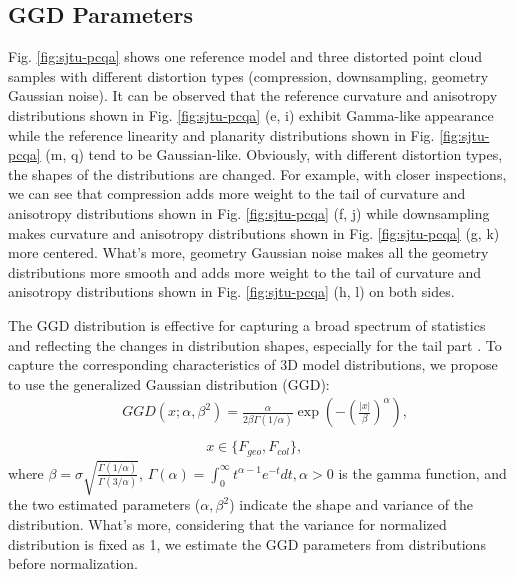 \documentclass[lettersize,journal]{IEEEtran}
\begin{document}
\subsection{GGD Parameters}
Fig. \ref{fig:sjtu-pcqa} shows one reference model and three distorted point cloud samples with  different distortion types  (compression,  downsampling,  geometry  Gaussian  noise). It can be observed that the reference curvature and anisotropy distributions shown in Fig. \ref{fig:sjtu-pcqa} (e, i) exhibit Gamma-like appearance while the reference linearity and planarity distributions shown in Fig. \ref{fig:sjtu-pcqa} (m, q) tend to be Gaussian-like. Obviously, with different distortion types, the shapes of the distributions are changed. For example, with closer inspections, we can see that compression adds more weight to the tail of curvature and anisotropy distributions shown in Fig. \ref{fig:sjtu-pcqa} (f, j) while downsampling makes curvature and anisotropy distributions shown in Fig. \ref{fig:sjtu-pcqa} (g, k) more centered. What's more, geometry Gaussian noise makes all the geometry distributions more smooth and adds more weight to the tail of curvature and anisotropy distributions shown in Fig. \ref{fig:sjtu-pcqa} (h, l) on both sides. 

The GGD distribution is effective for capturing a broad spectrum of statistics and reflecting the changes in distribution shapes, especially for the tail part \cite{sharifi1995estimation}.
To capture the corresponding characteristics of 3D model distributions, we propose to use the generalized Gaussian distribution (GGD):
\begin{equation}
\begin{aligned} 
&GGD(x;\alpha,\beta^2)=\frac{\alpha}{2 \beta \Gamma(1 / \alpha)} \exp \left(-\left(\frac{|x|}{\beta}\right)^{\alpha}\right),\\ \\
&\quad \quad \quad \quad \quad \quad  x \in \{{F_{geo}}, {F_{col}}\}, \label{equ:ggd}\end{aligned}
\end{equation}
where $\beta=\sigma \sqrt{\frac{\Gamma(1 / \alpha)}{\Gamma(3 / \alpha)}}$, $\Gamma(\alpha)=\int_{0}^{\infty} t^{\alpha-1} e^{-t} dt, \alpha>0$ is the gamma function, and the two estimated parameters ($\alpha,\beta^2$) indicate the shape and variance of the distribution. What's more, considering that the variance for normalized distribution is fixed as 1, we estimate the GGD parameters from distributions before normalization.  
\end{document}
